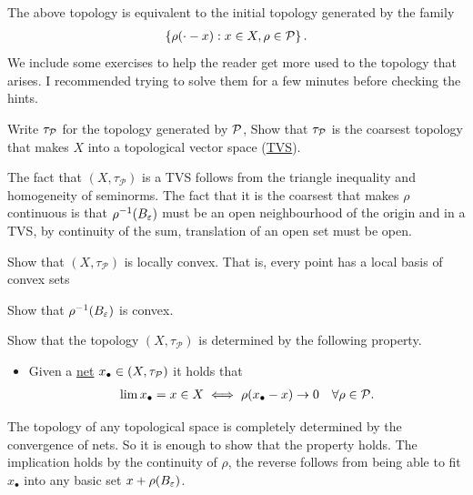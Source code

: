\documentclass[
    a4paper,
    DIV=14,
    abstract=true,
    numbers=noenddot
]{scrartcl}
\begin{document}
The above topology is equivalent to the initial topology generated by the family
\begin{align*}
	\left\{\rho(\cdot-x): x\in X, \rho \in \mathcal{P}\right\}.
\end{align*}
We include some exercises to help the reader get more used to the topology that arises. I recommended trying to solve them for a few minutes before checking the hints.
\begin{exercise}\label{TVS ex}
	Write $\tau_{\mathcal{P}}$ for the topology generated by $\mathcal{P}$, Show that $\tau_{\mathcal{P}}$ is the coarsest topology that makes $X$ into a topological vector space (\href{https://en.wikipedia.org/wiki/Topological_vector_space}{TVS}).
\end{exercise}
\begin{hint}
	The fact that $(X,\tau_\mathcal{P})$ is a TVS follows from the triangle inequality and homogeneity of seminorms. The fact that it is the coarsest that makes $\rho$ continuous is that $\rho^{-1}(B_\varepsilon)$ must be an open neighbourhood of the origin and in a TVS, by continuity of the sum, translation of an open set must be open.
\end{hint}
\begin{exercise}\label{convex ex}
	Show that $(X,\tau_\mathcal{P})$ is locally convex. That is, every point has a local basis of convex sets
\end{exercise}
\begin{hint}
	Show that $\rho^{-1}(B_\varepsilon)$ is convex.
\end{hint}
\begin{exercise}\label{convergence TVS}
	Show that the topology $(X,\tau_\mathcal{P})$ is determined by the following property.
	\begin{itemize}
		\item  Given a \href{https://en.wikipedia.org/wiki/Net_(mathematics)#:~:text=%5Bedit%5D-,Any,-function%20whose%20domain}{net} $x_\bullet\in (X,\tau_{\mathcal{P}})$  it holds that
		      \begin{align*}
			      \lim x_\bullet =x \in  X  \iff      \rho(x_\bullet-x)\to 0 \quad\forall \rho \in \mathcal{P}.
		      \end{align*}
	\end{itemize}
\end{exercise}
\begin{hint}
	The topology of any topological space is completely determined by the convergence of nets. So it is enough to show that the property holds. The implication holds by the continuity of  $\rho$, the reverse follows from being able to fit $x_\bullet$ into any basic set $x+\rho(B_\varepsilon)$.
\end{hint}
\end{document}
